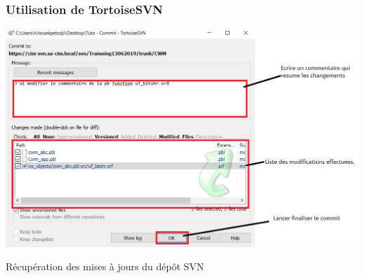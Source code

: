 \documentclass{beamer}
\begin{document}
\begin{frame}
\frametitle{Utilisation de TortoiseSVN}
\includegraphics[scale=.4]{../images/commentaire.jpg}
\end{frame}

\begin{frame}
\begin{center}
\huge{Récupération des mises à jours du dépôt SVN}
\end{center}
\end{frame}
\end{document}
